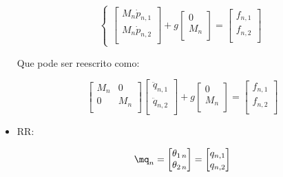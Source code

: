 \begin{itemize}
\begin{equation}
\begin{cases}
\begin{bmatrix}
M_n \dot{p}_{n,1} \\
M_n \dot{p}_{n,2} \\
\end{bmatrix}
+
g \begin{bmatrix}
0 \\
M_n \\
\end{bmatrix}
=
\begin{bmatrix}
f_{n, 1} \\
f_{n, 2} \\
\end{bmatrix}
\end{cases}
\end{equation}

Que pode ser reescrito como:

$$
\begin{bmatrix}
M_n & 0 \\
0 & M_n \\
\end{bmatrix}
\begin{bmatrix}
\ddot{q}_{n,1} \\
\ddot{q}_{n,2} \\
\end{bmatrix}
+
g \begin{bmatrix}
0 \\
M_n \\
\end{bmatrix}
=
\begin{bmatrix}
f_{n,1} \\
f_{n,2} \\
\end{bmatrix}
$$

\item RR:

\begin{equation}
\mq_n = \begin{bmatrix}
\theta_{1 \, n} \\
\theta_{2 \, n} \\
\end{bmatrix}
=
\begin{bmatrix}
q_{n,1} \\
q_{n,2} \\
\end{bmatrix}
\end{equation}


\end{itemize}
